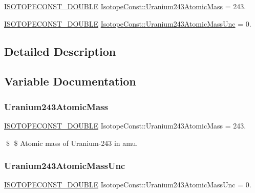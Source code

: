 \begin{DoxyCompactItemize}
\item 
\mbox{\hyperlink{group___isotope_const-_macros_ga8f45a7272ce02c0b4c65c44636ed719a}{I\+S\+O\+T\+O\+P\+E\+C\+O\+N\+S\+T\+\_\+\+D\+O\+U\+B\+LE}} \mbox{\hyperlink{group___isotope_const-_uranium-_u243_gad892af087453928d6fa92d0ea0d22421}{Isotope\+Const\+::\+Uranium243\+Atomic\+Mass}} = 243.
\item 
\mbox{\hyperlink{group___isotope_const-_macros_ga8f45a7272ce02c0b4c65c44636ed719a}{I\+S\+O\+T\+O\+P\+E\+C\+O\+N\+S\+T\+\_\+\+D\+O\+U\+B\+LE}} \mbox{\hyperlink{group___isotope_const-_uranium-_u243_ga363a309c64774fccd80b56614c36ab35}{Isotope\+Const\+::\+Uranium243\+Atomic\+Mass\+Unc}} = 0.
\end{DoxyCompactItemize}


\subsection{Detailed Description}


\subsection{Variable Documentation}
\mbox{\label{group___isotope_const-_uranium-_u243_gad892af087453928d6fa92d0ea0d22421}} 
\subsubsection{\texorpdfstring{Uranium243\+Atomic\+Mass}{Uranium243AtomicMass}}
{\footnotesize\ttfamily \mbox{\hyperlink{group___isotope_const-_macros_ga8f45a7272ce02c0b4c65c44636ed719a}{I\+S\+O\+T\+O\+P\+E\+C\+O\+N\+S\+T\+\_\+\+D\+O\+U\+B\+LE}} Isotope\+Const\+::\+Uranium243\+Atomic\+Mass = 243.}

\$ \$ Atomic mass of Uranium-\/243 in amu. \mbox{\label{group___isotope_const-_uranium-_u243_ga363a309c64774fccd80b56614c36ab35}} 
\subsubsection{\texorpdfstring{Uranium243\+Atomic\+Mass\+Unc}{Uranium243AtomicMassUnc}}
{\footnotesize\ttfamily \mbox{\hyperlink{group___isotope_const-_macros_ga8f45a7272ce02c0b4c65c44636ed719a}{I\+S\+O\+T\+O\+P\+E\+C\+O\+N\+S\+T\+\_\+\+D\+O\+U\+B\+LE}} Isotope\+Const\+::\+Uranium243\+Atomic\+Mass\+Unc = 0.}

